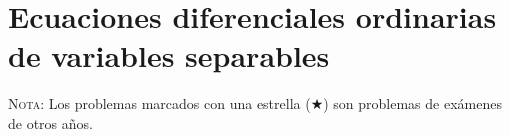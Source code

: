 \documentclass[a4paper,titlepage]{article}
\begin{document}



\section{Ecuaciones diferenciales ordinarias de variables separables}
\begin{enumerate}[leftmargin=*]
\end{enumerate}




\vspace{2cm}

\textsc{Nota}: Los problemas marcados con una estrella ($\bigstar$) son problemas de
exámenes de otros años.
\end{document}

